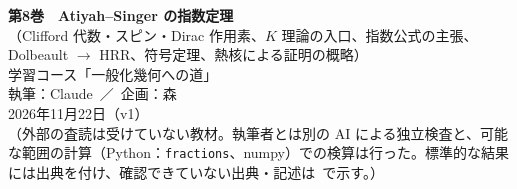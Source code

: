
\usepackage{tikz}
\usepackage{tikz-cd}
\usetikzlibrary{arrows.meta,positioning,calc}
\newcommand{\Oc}{\mathcal O}
\newcommand{\CP}{\mathbb{CP}}
\newcommand{\Ker}{\operatorname{Ker}}
\newcommand{\Ran}{\operatorname{Ran}}
\newcommand{\Coker}{\operatorname{Coker}}
\newcommand{\Ahat}{\widehat{A}}
\newcommand{\Lg}{\mathsf{L}}
\newcommand{\sgn}{\operatorname{sign}}
\newcommand{\Cl}{\mathrm{Cl}}
\newcommand{\Spin}{\mathrm{Spin}}
\newcommand{\Spinc}{\mathrm{Spin}^c}
\newcommand{\SO}{\mathrm{SO}}
\newcommand{\SU}{\mathrm{SU}}
\newcommand{\U}{\mathrm{U}}
\newcommand{\Tr}{\operatorname{Tr}}
\newcommand{\str}{\operatorname{str}}
\newcommand{\tr}{\operatorname{tr}}
\newcommand{\scal}{\mathrm{scal}}
\newcommand{\Ric}{\mathrm{Ric}}
\newcommand{\ip}[2]{\langle #1,#2\rangle}
\newcommand{\Spn}{\mathsf S}
\newcommand{\cm}{c}%
\newcommand{\vol}{\mathrm{vol}}
\newcommand{\Op}{\operatorname{Op}}
\renewcommand{\contentsname}{目次}\renewcommand{\figurename}{図}
\usepackage{fontspec}\newfontfamily{}

\sloppy
\begin{center}
{\LARGE\bfseries\sffamily 第8巻　Atiyah--Singer の指数定理}\\[4pt]
{\large\sffamily （Clifford 代数・スピン・Dirac 作用素、$K$ 理論の入口、指数公式の主張、Dolbeault $\to$ HRR、符号定理、熱核による証明の概略）}\\[8pt]
{\large 学習コース「一般化幾何への道」}\\[6pt]
{\large 執筆：Claude\ ／\ 企画：森}\\[3pt]
2026年11月22日（v1）\\[3pt]
{\small （外部の査読は受けていない教材。執筆者とは別の AI による独立検査と、可能な範囲の計算（Python：\texttt{fractions}、numpy）での検算は行った。標準的な結果には出典を付け、確認できていない出典・記述は\tQ\ で示す。）}
\end{center}


